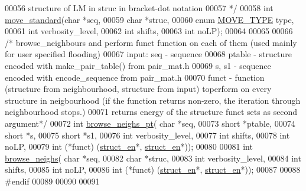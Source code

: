 \begin{DoxyCode}
00056 \textcolor{comment}{          structure of LM in struc in bracket-dot notation}
00057 \textcolor{comment}{*/}
00058 \textcolor{keywordtype}{int} \mbox{\hyperlink{move__set_8h_a56459af0f922fa9788050c7f43733d14}{move\_standard}}(\textcolor{keywordtype}{char} *seq,
00059                   \textcolor{keywordtype}{char} *struc,
00060                   \textcolor{keyword}{enum} \mbox{\hyperlink{move__set_8h_ae69287964278ca9a447864d392ee2892}{MOVE\_TYPE}} type,
00061                   \textcolor{keywordtype}{int} verbosity\_level,
00062                   \textcolor{keywordtype}{int} shifts,
00063                   \textcolor{keywordtype}{int} noLP);
00064 
00065 
00066 \textcolor{comment}{/* browse\_neighbours and perform funct function on each of them (used mainly for user specified flooding)}
00067 \textcolor{comment}{    input:    seq - sequence}
00068 \textcolor{comment}{              ptable - structure encoded with make\_pair\_table() from pair\_mat.h}
00069 \textcolor{comment}{              s, s1 - sequence encoded with encode\_sequence from pair\_mat.h}
00070 \textcolor{comment}{              funct - function (structure from neighbourhood, structure from input) toperform on every
       structure in neigbourhood (if the function returns non-zero, the iteration through neighbourhood stops.)}
00071 \textcolor{comment}{    returns energy of the structure funct sets as second argument*/}
00072 \textcolor{keywordtype}{int} \mbox{\hyperlink{move__set_8h_adc1a5de7aada212c4a53b573d83a9fef}{browse\_neighs\_pt}}( \textcolor{keywordtype}{char} *seq,
00073                    \textcolor{keywordtype}{short} *ptable,
00074                    \textcolor{keywordtype}{short} *s,
00075                    \textcolor{keywordtype}{short} *s1,
00076                    \textcolor{keywordtype}{int} verbosity\_level,
00077                    \textcolor{keywordtype}{int} shifts,
00078                    \textcolor{keywordtype}{int} noLP,
00079                    \textcolor{keywordtype}{int} (*funct) (\mbox{\hyperlink{struct__struct__en}{struct\_en}}*, \mbox{\hyperlink{struct__struct__en}{struct\_en}}*));
00080 
00081 \textcolor{keywordtype}{int} \mbox{\hyperlink{move__set_8h_adb5e5d038631d03e55b3d199196d90dd}{browse\_neighs}}( \textcolor{keywordtype}{char} *seq,
00082                    \textcolor{keywordtype}{char} *struc,
00083                    \textcolor{keywordtype}{int} verbosity\_level,
00084                    \textcolor{keywordtype}{int} shifts,
00085                    \textcolor{keywordtype}{int} noLP,
00086                    \textcolor{keywordtype}{int} (*funct) (\mbox{\hyperlink{struct__struct__en}{struct\_en}}*, \mbox{\hyperlink{struct__struct__en}{struct\_en}}*));
00087 
00088 \textcolor{preprocessor}{#endif}
00089 
00090 
00091 
\end{DoxyCode}
